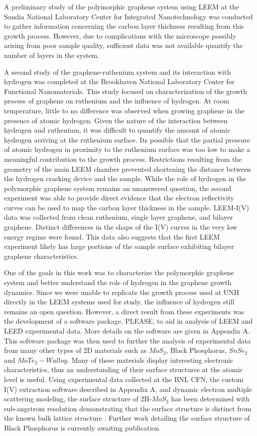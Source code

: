 A preliminary study of the polymorphic graphene system using LEEM at the Sandia National Laboratory Center for Integrated Nanotechnology was conducted to gather information concerning the carbon layer thickness resulting from this growth process. However, due to complications with the microscope possibly arising from poor sample quality, sufficient data was not available quantify the number of layers in the system.

A second study of the graphene-ruthenium system and its interaction with hydrogen was completed at the Brookhaven National Laboratory Center for Functional Nanomaterials. This study focused on characterization of the growth process of graphene on ruthenium and the influence of hydrogen. At room temperature, little to no difference was observed when growing graphene in the presence of atomic hydrogen. Given the nature of the interaction between hydrogen and ruthenium, it was difficult to quantify the amount of atomic hydrogen arriving at the ruthenium surface. Its possible that the partial pressure of atomic hydrogen in proximity to the ruthenium surface was too low to make a meaningful contribution to the growth process. Restrictions resulting from the geometry of the main LEEM chamber prevented shortening the distance between the hydrogen cracking device and the sample. While the role of hydrogen in the polymorphic graphene system remains an unanswered question, the second experiment was able to provide direct evidence that the electron reflectivity curves can be used to map the carbon layer thickness in the sample. LEEM-I(V) data was collected from clean ruthenium, single layer graphene, and bilayer graphene. Distinct differences in the shape of the I(V) curves in the very low energy regime were found. This data also suggests that the first LEEM experiment likely has large portions of the sample surface exhibiting bilayer graphene characteristics.

One of the goals in this work was to characterize the polymorphic graphene system and better understand the role of hydrogen in the graphene growth dynamics. Since we were unable to replicate the growth process used at UNH directly in the LEEM systems used for study, the influence of hydrogen still remains an open question. However, a direct result from these experiments was the development of a software package, PLEASE, to aid in analysis of LEEM and LEED experimental data. More details on the software are given in Appendix A. This software package was then used to further the analysis of experimental data from many other types of 2D materials such as $MoS_2$, Black Phosphorus, $SnSe_2$ and $MoTe_2-W alloy$. Many of these materials display interesting electronic characteristics, thus an understanding of their surface structures at the atomic level is useful. Using experimental data collected at the BNL CFN, the custom I(V) extraction software described in Appendix A, and dynamic electron multiple scattering modeling, the surface structure of 2H-$MoS_2$ has been determined with sub-angstrom resolution demonstrating that the surface structure is distinct from the known bulk lattice structure \cite{mos2-surfsci}. Further work detailing the surface structure of Black Phosphorus is currently awaiting publication.

